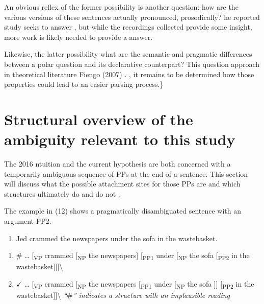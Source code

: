 \documentclass[12pt,oneside]{book}
\providecommand{\tightlist}{%
  \setlength{\itemsep}{0pt}\setlength{\parskip}{0pt}}
\begin{document}
An obvious reflex of the former possibility is another question: how are the various versions of these sentences actually pronounced, prosodically? he reported study seeks to answer , but while the recordings collected provide some insight, more work is likely needed to  provide a answer.

Likewise, the latter possibility  what are the semantic and pragmatic differences between a polar question and its declarative counterpart? This question  approach in  theoretical  literature  Fiengo (2007) \added{)}. , it remains to be determined how those properties could lead to an easier  parsing process.\}

\hypertarget{mech}{%
\section{Structural overview of the ambiguity relevant to this study}\label{mech}}

The 2016 ntuition and the current hypothesis are both concerned with a temporarily ambiguous sequence of PPs at the end of a sentence. This section will discuss what the possible attachment sites for those PPs are and which structures ultimately do and do not .

The example in (12) shows a pragmatically disambiguated sentence with an argument-PP2. 

\begin{enumerate}
\def\labelenumi{(\arabic{enumi})}
\setcounter{enumi}{11}
\tightlist
\item
  Jed crammed the newspapers under the sofa in the wastebasket.
\end{enumerate}

\begin{enumerate}
\def\labelenumi{\alph{enumi})}
\tightlist
\item
  \(\#\) \ldots{} {[}\textsubscript{VP} crammed {[}\textsubscript{NP} the newspapers{]} {[}\textsubscript{PP1} under {[}\textsubscript{NP} the sofa {[}\textsubscript{PP2} in the wastebasket{]}{]}{]}\textbackslash{}
\item
  \(\checkmark\) \ldots{} {[}\textsubscript{VP} crammed {[}\textsubscript{NP} the newspapers {[}\textsubscript{PP1} under {[}\textsubscript{NP} the sofa {]}{]} {[}\textsubscript{PP2} in the wastebasket{]}{]}\textbackslash{}
  \emph{``\(\#\)'' indicates a structure with an implausible reading}
\end{enumerate}
\end{document}
